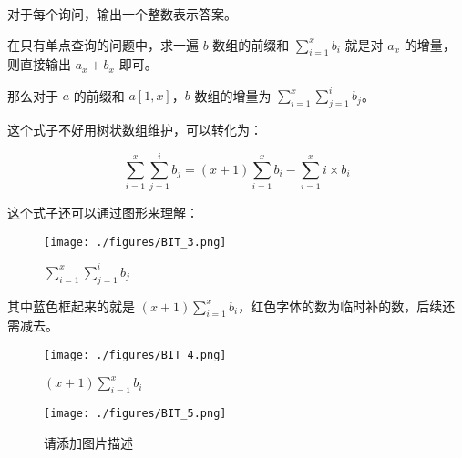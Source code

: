 对于每个询问，输出一个整数表示答案。

在只有单点查询的问题中，求一遍 $b$ 数组的前缀和 $\sum\limits^x_{i=1}b_i$ 就是对 $a_x$ 的增量，则直接输出 $a_x + b_x$ 即可。

那么对于 $a$ 的前缀和 $a[1, x]$，$b$ 数组的增量为 $\sum\limits^x_{i=1}\sum\limits^i_{j=1}b_j$。

这个式子不好用树状数组维护，可以转化为：

\begin{equation}
\sum\limits^x_{i=1}\sum\limits^i_{j=1}b_j = (x + 1)\sum\limits^x_{i=1}b_i - \sum\limits^x_{i=1}i \times b_i
\end{equation}

这个式子还可以通过图形来理解：

\begin{figure}[ht]
\centering
\texttt{[image: ./figures/BIT\_3.png]}
\caption{$\sum\limits^x_{i=1}\sum\limits^i_{j=1}b_j$} \label{BIT_fig3}
\end{figure}


其中蓝色框起来的就是 $(x + 1)\sum\limits^x_{i=1}b_i$，红色字体的数为临时补的数，后续还需减去。

\begin{figure}[ht]
\centering
\texttt{[image: ./figures/BIT\_4.png]}
\caption{$(x + 1)\sum\limits^x_{i=1}b_i$} \label{BIT_fig4}
\end{figure}

\begin{figure}[ht]
\centering
\texttt{[image: ./figures/BIT\_5.png]}
\caption{请添加图片描述} \label{BIT_fig5}
\end{figure}